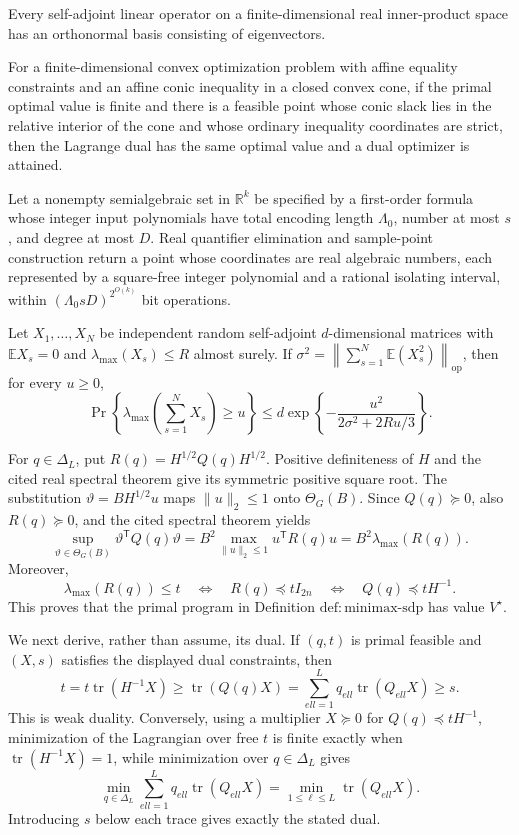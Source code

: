 Every self-adjoint linear operator on a finite-dimensional real inner-product space has an orthonormal basis consisting of eigenvectors.

For a finite-dimensional convex optimization problem with affine equality constraints and an affine conic inequality in a closed convex cone, if the primal optimal value is finite and there is a feasible point whose conic slack lies in the relative interior of the cone and whose ordinary inequality coordinates are strict, then the Lagrange dual has the same optimal value and a dual optimizer is attained.

Let a nonempty semialgebraic set in \(\mathbb R^k\) be specified by a first-order formula whose integer input polynomials have total encoding length \(\Lambda_0\), number at most \(s\), and degree at most \(D\).  Real quantifier elimination and sample-point construction return a point whose coordinates are real algebraic numbers, each represented by a square-free integer polynomial and a rational isolating interval, within \((\Lambda_0sD)^{2^{O(k)}}\) bit operations.

Let \(X_1,\ldots,X_N\) be independent random self-adjoint \(d\)-dimensional matrices with \(\mathbb E X_s=0\) and \(\lambda_{\max}(X_s)\le R\) almost surely.  If \(\sigma^2=\left\|\sum_{s=1}^N\mathbb E(X_s^2)\right\|_{\mathrm{op}}\), then for every \(u\ge0\),
\[
 \Pr\!\left\{\lambda_{\max}\!\left(\sum_{s=1}^NX_s\right)\ge u\right\}
 \le d\exp\!\left\{-\frac{u^2}{2\sigma^2+2Ru/3}\right\}.
\]

For \(q\in\Delta_L\), put \(R(q)=H^{1/2}Q(q)H^{1/2}\).  Positive definiteness of \(H\) and the cited real spectral theorem give its symmetric positive square root.  The substitution \(\vartheta=BH^{1/2}u\) maps \(\|u\|_2\le1\) onto \(\Theta_G(B)\).  Since \(Q(q)\succeq0\), also \(R(q)\succeq0\), and the cited spectral theorem yields
\[
 \sup_{\vartheta\in\Theta_G(B)}\vartheta^{\mathsf T}Q(q)\vartheta
 =B^2\max_{\|u\|_2\le1}u^{\mathsf T}R(q)u
 =B^2\lambda_{\max}(R(q)).
\]
Moreover,
\[
 \lambda_{\max}(R(q))\le t
 \quad\Longleftrightarrow\quad
 R(q)\preceq tI_{2n}
 \quad\Longleftrightarrow\quad
 Q(q)\preceq tH^{-1}.
\]
This proves that the primal program in Definition \(\mathrm{def:minimax\mbox{-}sdp}\) has value \(V^{\star}\).

We next derive, rather than assume, its dual.  If \((q,t)\) is primal feasible and \((X,s)\) satisfies the displayed dual constraints, then
\[
 t
 =t\operatorname{tr}(H^{-1}X)
 \ge\operatorname{tr}(Q(q)X)
 =\sum_{ell=1}^Lq_{ell}\operatorname{tr}(Q_{ell}X)
 \ge s.
\]
This is weak duality.  Conversely, using a multiplier \(X\succeq0\) for \(Q(q)\preceq tH^{-1}\), minimization of the Lagrangian over free \(t\) is finite exactly when \(\operatorname{tr}(H^{-1}X)=1\), while minimization over \(q\in\Delta_L\) gives
\[
 \min_{q\in\Delta_L}\sum_{ell=1}^Lq_{ell}\operatorname{tr}(Q_{ell}X)
 =\min_{1\le\ell\le L}\operatorname{tr}(Q_{ell}X).
\]
Introducing \(s\) below each trace gives exactly the stated dual.

